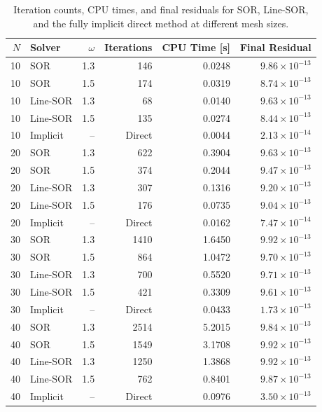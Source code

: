 \begin{table}[H]
    \centering
    \footnotesize
    \setlength{\tabcolsep}{4pt}
    \caption{Iteration counts, CPU times, and final residuals for SOR, Line-SOR, and the fully implicit direct method at different mesh sizes.}
    \label{tab:solver_cpu_time_comparison}
        \begin{tabular}{rlrrrr}
            \toprule
            \textbf{$N$} &
            \textbf{Solver} &
            \textbf{$\omega$} &
            \textbf{Iterations} &
            \textbf{CPU Time [s]} &
            \textbf{Final Residual} \\
            \midrule
            10 & SOR      & 1.3 & 146    & 0.0248 & $9.86\times10^{-13}$ \\
            10 & SOR      & 1.5 & 174    & 0.0319 & $8.74\times10^{-13}$ \\
            10 & Line-SOR & 1.3 & 68     & 0.0140 & $9.63\times10^{-13}$ \\
            10 & Line-SOR & 1.5 & 135    & 0.0274 & $8.44\times10^{-13}$ \\
            10 & Implicit & --  & Direct & 0.0044 & $2.13\times10^{-14}$ \\
            \midrule
            20 & SOR      & 1.3 & 622    & 0.3904 & $9.63\times10^{-13}$ \\
            20 & SOR      & 1.5 & 374    & 0.2044 & $9.47\times10^{-13}$ \\
            20 & Line-SOR & 1.3 & 307    & 0.1316 & $9.20\times10^{-13}$ \\
            20 & Line-SOR & 1.5 & 176    & 0.0735 & $9.04\times10^{-13}$ \\
            20 & Implicit & --  & Direct & 0.0162 & $7.47\times10^{-14}$ \\
            \midrule
            30 & SOR      & 1.3 & 1410   & 1.6450 & $9.92\times10^{-13}$ \\
            30 & SOR      & 1.5 & 864    & 1.0472 & $9.70\times10^{-13}$ \\
            30 & Line-SOR & 1.3 & 700    & 0.5520 & $9.71\times10^{-13}$ \\
            30 & Line-SOR & 1.5 & 421    & 0.3309 & $9.61\times10^{-13}$ \\
            30 & Implicit & --  & Direct & 0.0433 & $1.73\times10^{-13}$ \\
            \midrule
            40 & SOR      & 1.3 & 2514   & 5.2015 & $9.84\times10^{-13}$ \\
            40 & SOR      & 1.5 & 1549   & 3.1708 & $9.92\times10^{-13}$ \\
            40 & Line-SOR & 1.3 & 1250   & 1.3868 & $9.92\times10^{-13}$ \\
            40 & Line-SOR & 1.5 & 762    & 0.8401 & $9.87\times10^{-13}$ \\
            40 & Implicit & --  & Direct & 0.0976 & $3.50\times10^{-13}$ \\
            \bottomrule
        \end{tabular}%
    
\end{table}

